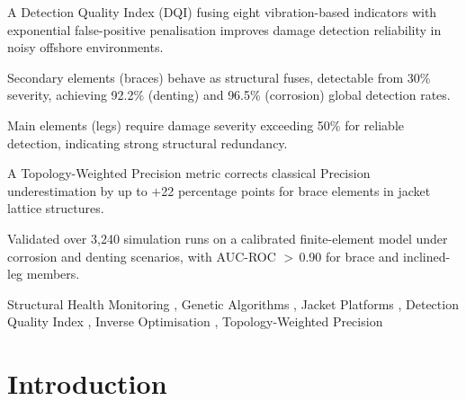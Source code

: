 \documentclass[preprint,12pt]{elsarticle}
\begin{document}
\begin{frontmatter}
\begin{highlights}
\item A Detection Quality Index (DQI) fusing eight vibration-based indicators with exponential false-positive penalisation improves damage detection reliability in noisy offshore environments.
\item Secondary elements (braces) behave as structural fuses, detectable from 30\% severity, achieving 92.2\% (denting) and 96.5\% (corrosion) global detection rates.
\item Main elements (legs) require damage severity exceeding 50\% for reliable detection, indicating strong structural redundancy.
\item A Topology-Weighted Precision metric corrects classical Precision underestimation by up to $+$22 percentage points for brace elements in jacket lattice structures.
\item Validated over 3{,}240 simulation runs on a calibrated finite-element model under corrosion and denting scenarios, with AUC-ROC $>$\,0.90 for brace and inclined-leg members.
\end{highlights}

\begin{keyword}
  Structural Health Monitoring \sep
  Genetic Algorithms \sep
  Jacket Platforms \sep
  Detection Quality Index \sep
  Inverse Optimisation \sep
  Topology-Weighted Precision
\end{keyword}

\end{frontmatter}


\section{Introduction}
\end{document}
